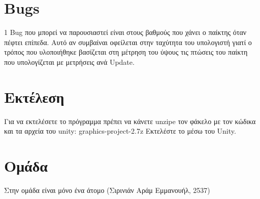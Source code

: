 \documentclass{article}
\begin{document}
\section{Bugs}

1 Bug
που μπορεί να παρουσιαστεί είναι στους βαθμούς
που χάνει ο παίκτης όταν πέφτει επίπεδα. Αυτό αν
συμβαίναι οφείλεται στην ταχύτητα του υπολογιστή γιατί
ο τρόπος που υλοποιήθηκε βασίζεται στη μέτρηση του
ύψους τις πτώσεις του παίκτη που υπολογίζεται με μετρήσεις
ανά
Update.

\section{Εκτέλεση}

Για να εκτελέσετε το πρόγραμμα πρέπει να κάνετε
unzipe
τον φάκελο με τον κώδικα και τα αρχεία του
unity: graphics-project-2.7z
Εκτελέστε το μέσω του
Unity.

\section{Ομάδα}

Στην ομάδα είναι μόνο ένα άτομο (Σιρινιάν Αράμ Εμμανουήλ, 2537)
\end{document}
